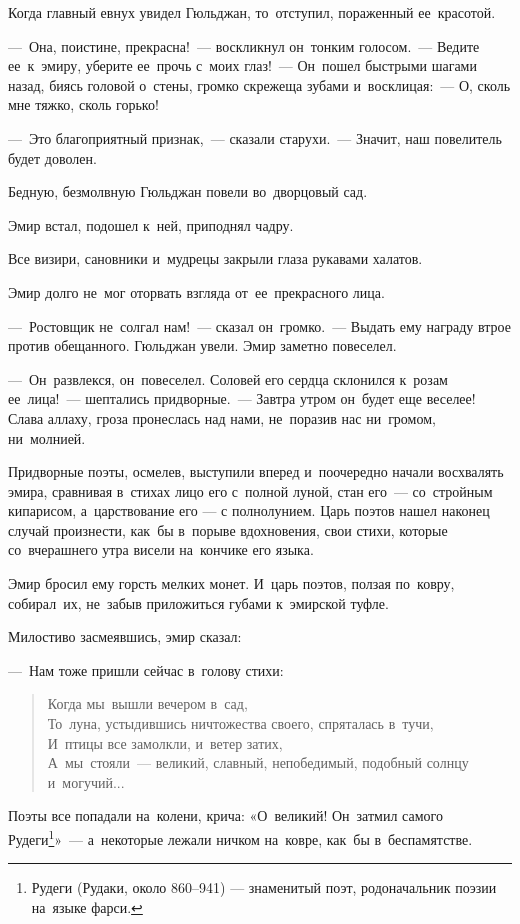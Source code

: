 \documentclass[12pt,a4paper]{book}
\begin{document}
Когда главный евнух увидел Гюльджан, то~отступил, пораженный ее~красотой.

—~Она, поистине, прекрасна!~— воскликнул он~тонким голосом.~— Ведите ее~к~эмиру, уберите ее~прочь с~моих глаз!~— Он~пошел быстрыми шагами назад, биясь головой о~стены, громко скрежеща зубами и~восклицая:~— О, сколь мне тяжко, сколь горько!

—~Это благоприятный признак,~— сказали старухи.~— Значит, наш повелитель будет доволен.

Бедную, безмолвную Гюльджан повели во~дворцовый сад.

Эмир встал, подошел к~ней, приподнял чадру.

Все визири, сановники и~мудрецы закрыли глаза рукавами халатов.

Эмир долго не~мог оторвать взгляда от~ее~прекрасного лица.

—~Ростовщик не~солгал нам!~— сказал он~громко.~— Выдать ему награду втрое против обещанного. Гюльджан увели. Эмир заметно повеселел.

—~Он~развлекся, он~повеселел. Соловей его сердца склонился к~розам ее~лица!~— шептались придворные.~— Завтра утром он~будет еще веселее! Слава аллаху, гроза пронеслась над нами, не~поразив нас ни~громом, ни~молнией.

Придворные поэты, осмелев, выступили вперед и~поочередно начали восхвалять эмира, сравнивая в~стихах лицо его с~полной луной, стан его~— со~стройным кипарисом, а~царствование его --- с полнолунием. Царь поэтов нашел наконец случай произнести, как~бы в~порыве вдохновения, свои стихи, которые со~вчерашнего утра висели на~кончике его языка.

Эмир бросил ему горсть мелких монет. И~царь поэтов, ползая по~ковру, собирал~их, не~забыв приложиться губами к~эмирской туфле.

Милостиво засмеявшись, эмир сказал:

—~Нам тоже пришли сейчас в~голову стихи:

\begin{verse}
Когда мы~вышли вечером в~сад, \\
То~луна, устыдившись ничтожества своего, спряталась в~тучи, \\
И~птицы все замолкли, и~ветер затих, \\
А~мы~стояли~— великий, славный, непобедимый, подобный солнцу и~могучий...	
\end{verse}

Поэты все попадали на~колени, крича: «О~великий! Он~затмил самого Рудеги\footnote{Рудеги (Рудаки, около 860--941) — знаменитый поэт, родоначальник поэзии на~языке фарси.}»~— а~некоторые лежали ничком на~ковре, как~бы в~беспамятстве.
\end{document}
